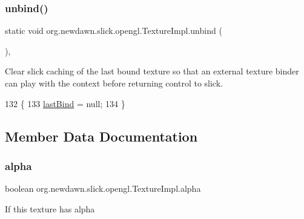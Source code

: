 \subsubsection{\texorpdfstring{unbind()}{unbind()}}
{\footnotesize\ttfamily static void org.\+newdawn.\+slick.\+opengl.\+Texture\+Impl.\+unbind (\begin{DoxyParamCaption}{ }\end{DoxyParamCaption})\hspace{0.3cm}{\ttfamily [inline]}, {\ttfamily [static]}}

Clear slick caching of the last bound texture so that an external texture binder can play with the context before returning control to slick. 
\begin{DoxyCode}
132                                 \{
133         \mbox{\hyperlink{classorg_1_1newdawn_1_1slick_1_1opengl_1_1_texture_impl_ae726e8066199fe500031c7058f3459c3}{lastBind}} = null;
134     \}
\end{DoxyCode}


\subsection{Member Data Documentation}
\mbox{\label{classorg_1_1newdawn_1_1slick_1_1opengl_1_1_texture_impl_a315687e46129b509c38a9f0ab10adee4}} 
\subsubsection{\texorpdfstring{alpha}{alpha}}
{\footnotesize\ttfamily boolean org.\+newdawn.\+slick.\+opengl.\+Texture\+Impl.\+alpha\hspace{0.3cm}{\ttfamily [private]}}

If this texture has alpha \mbox{\label{classorg_1_1newdawn_1_1slick_1_1opengl_1_1_texture_impl_a2b5b9b6700d8cc41e1bd79adbf2bf8fc}} 
